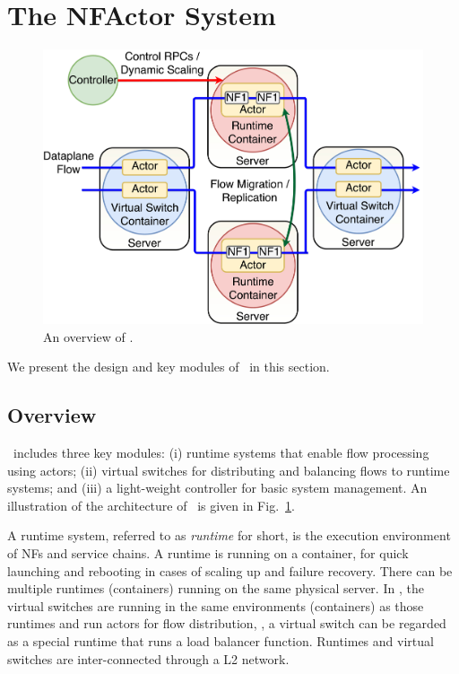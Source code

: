 \section {The NFActor System}

\begin{figure}[!t]
  \centering
  \includegraphics[width=\columnwidth]{figure/new-nfactor-cluster.pdf}
  \caption{An overview of \nfactor.}
  \label{fig:runtime}
\end{figure}

We present the design and key modules of \nfactor~in this section.

\subsection{Overview}

\nfactor~includes three key modules: (i) runtime systems that enable flow processing using actors; (ii) virtual switches for distributing and balancing flows to runtime systems; and (iii) a light-weight controller for basic system management. %
 An illustration of the architecture of \nfactor~is given in Fig.~\ref{fig:runtime}.

A runtime system, referred to as \textit{runtime} for short, is the execution environment of NFs and service chains. A runtime is running on a container, for quick launching and rebooting in cases of scaling up and failure recovery. There can be multiple runtimes (containers) running on the same physical server. In \nfactor, the virtual switches are running in the same environments (containers) as those runtimes and run actors for flow distribution, \ie, a virtual switch can be regarded as a special runtime that runs a load balancer function. Runtimes and virtual switches are inter-connected through a L2 network.

